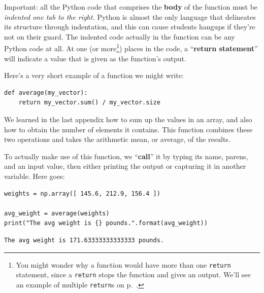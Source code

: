 
Important: all the Python code that comprises the \textbf{body} of the function
must be \textit{indented one tab to the right.} Python is almost the only
language that delineates its structure through indentation, and this can cause
students hangups if they're not on their guard. The indented code actually in
the function can be any Python code at all. At one (or more\footnote{You might
wonder why a function would have more than one \texttt{return} statement, since
a \texttt{return} stops the function and gives an output. We'll see an example
of multiple \texttt{return}s on p.~\pageref{multipleReturns}.}) places in the 
code, a ``\textbf{return statement}'' will indicate a value that is given as
the function's output.

Here's a very short example of a function we might write:


\begin{Verbatim}[fontsize=\small,samepage=true,frame=single,framesep=3mm]
def average(my_vector):
    return my_vector.sum() / my_vector.size
\end{Verbatim}

We learned in the last appendix how to sum up the values in an array, and also
how to obtain the number of elements it contains. This function combines these
two operations and takes the arithmetic mean, or average, of the results.


To actually make use of this function, we ``\textbf{call}'' it by typing its
name, parens, and an input value, then either printing the output or capturing
it in another variable. Here goes:

\begin{Verbatim}[fontsize=\small,samepage=true,frame=single,framesep=3mm]
weights = np.array([ 145.6, 212.9, 156.4 ])

avg_weight = average(weights)
print("The avg weight is {} pounds.".format(avg_weight))
\end{Verbatim}
\vspace{-.2in}

\begin{Verbatim}[fontsize=\small,samepage=true,frame=leftline,framesep=5mm,framerule=1mm]
The avg weight is 171.63333333333333 pounds.
\end{Verbatim}


